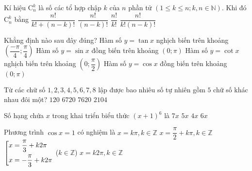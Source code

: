 \begin{ex}%
Kí hiệu $\mathrm{C}^k_n$ là số các tổ hợp chập $k$ của $n$ phần tử $(1\leq k \leq n; k, n\in \mathbb{N})$. Khi đó $\mathrm{C}^k_n$ bằng
\choice
{$\dfrac{n!}{k!+(n-k)!}$}
{$\dfrac{n!}{(n-k)!}$}
{$\dfrac{n!}{k!}$}
{\True $\dfrac {n!}{k!(n-k)!}$}
\end{ex}

\begin{ex}%
Khẳng định nào sau đây đúng?
\choice
{Hàm số $y=\tan x$ nghịch biến trên khoảng $\left(\dfrac{-\pi}{4};\dfrac{\pi}{4}\right)$}
{Hàm số $y=\sin x$ đồng biến trên khoảng $\left(0;\pi\right)$}
{\True Hàm số $y=\cot x$ nghịch biến trên khoảng $\left(0;\dfrac{\pi}{2}\right)$}
{Hàm số $y=\cos x$ đồng biến trên khoảng $\left(0;\pi\right)$}
\end{ex}

\begin{ex}%
Từ các chữ số $1,2,3,4,5,6,7,8$ lập được bao nhiêu số tự nhiên gồm $5$ chữ số khác nhau đôi một?
\choice
{$120$}
{$6720$}
{\True $7620$}
{$2104$}
\end{ex}

\begin{ex}%
Số hạng chứa $x$ trong khai triển biểu thức $(x+1)^6$ là
\choice
{$7x$}
{$5x$}
{$4x$}
{\True $6x$}
\end{ex}

\begin{ex}%
Phương trình $\cos x=1$ có nghiệm là
\choice
{$x=k\pi, k\in \mathbb{Z}$}
{$x=\dfrac{\pi}{2}+k\pi, k\in \mathbb{Z}$}
{$\left[\begin{aligned}&x= \dfrac{\pi}{3}+k2\pi\\&x=-\dfrac{\pi}{3}+k2\pi\end{aligned}\right.$ ($k\in\mathbb{Z}$)}
{\True $x=k2\pi, k\in \mathbb{Z}$}
\end{ex}

